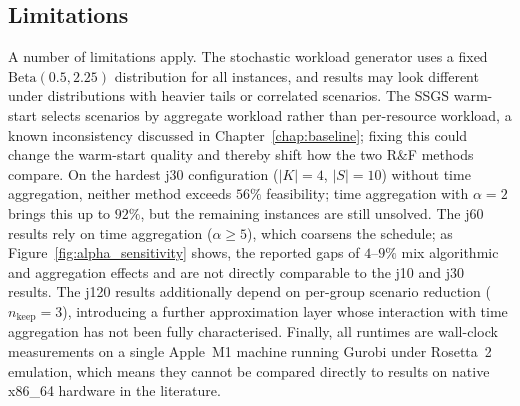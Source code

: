 \subsection{Limitations}
\label{subsec:limitations}
A number of limitations apply. The stochastic workload
generator uses a fixed $\mathrm{Beta}(0.5,2.25)$ distribution
for all instances, and results may look different under
distributions with heavier tails or correlated scenarios. The
SSGS warm-start selects scenarios by aggregate workload rather
than per-resource workload, a known inconsistency discussed in
Chapter~\ref{chap:baseline}; fixing this could change the
warm-start quality and thereby shift how the two R\&F methods
compare. On the hardest j30 configuration ($|K|=4$, $|S|=10$)
without time aggregation, neither method exceeds $56\%$
feasibility; time aggregation with $\alpha=2$ brings this up to
$92\%$, but the remaining instances are still unsolved. The j60
results rely on time aggregation ($\alpha \geq 5$), which
coarsens the schedule; as
Figure~\ref{fig:alpha_sensitivity} shows, the reported gaps of
$4$--$9\%$ mix algorithmic and aggregation effects and are not
directly comparable to the j10 and j30 results. The j120
results additionally depend on per-group scenario reduction
($n_{\mathrm{keep}}=3$), introducing a further approximation
layer whose interaction with time aggregation has not been
fully characterised. Finally, all runtimes
are wall-clock measurements on a single Apple~M1 machine
running Gurobi under Rosetta~2 emulation, which means they
cannot be compared directly to results on native x86\_64
hardware in the literature.
